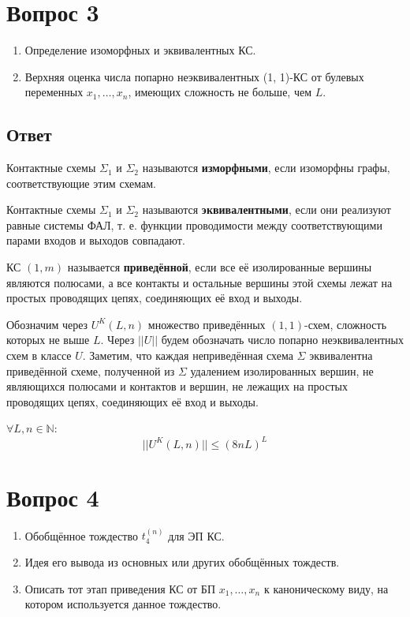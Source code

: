 \documentclass[11pt]{article}
\def\zall{\setcounter{Def}{0}\setcounter{lem}{0}\setcounter{cnsqnc}{0}\setcounter{th}{0}\setcounter{Cmt}{0}\setcounter{equation}{0}\setcounter{stnmt}{0}}
\newcounter{Def}\setcounter{Def}{0}
\def\df{\par\smallskip\refstepcounter{Def}\textbf{\arabic{Def}}}
\newtheorem*{Def}{Определение \df}
\newcounter{lem}\setcounter{lem}{0}
\def\lm{\par\smallskip\refstepcounter{lem}\textbf{\arabic{lem}}}
\newtheorem*{Lemma}{Лемма \lm}
\newcounter{th}\setcounter{th}{0}
\newcounter{cnsqnc}\setcounter{cnsqnc}{0}
\newcounter{Cmt}\setcounter{Cmt}{0}
\newcounter{stnmt}\setcounter{stnmt}{0}
\begin{document}
\section{Вопрос 3}
\label{sec:org0a22519}
\zall
\begin{enumerate}
\item Определение изоморфных и эквивалентных КС.
\item Верхняя оценка числа попарно неэквивалентных (1, 1)-КС от булевых переменных \(x_1, \ldots, x_n\), имеющих сложность не больше, чем \(L\).
\end{enumerate}
\subsection{Ответ}
\label{sec:org7de6af1}
   \begin{Def}
Контактные схемы $\Sigma_1$ и $\Sigma_2$ называются \textbf{изморфными}, если изоморфны 
графы, соответствующие этим схемам.
   \end{Def}
\begin{Def}
Контактные схемы $\Sigma_1$ и $\Sigma_2$ называются \textbf{эквивалентными}, если они реализуют равные системы ФАЛ, т. е. функции проводимости между соответствующими парами входов и выходов совпадают.
\end{Def}
\begin{Def}
КС $(1, m)$ называется \textbf{приведённой}, если все её изолированные вершины являются полюсами, а все контакты и остальные вершины этой схемы лежат на простых проводящих цепях, соединяющих её вход и выходы.
\end{Def}
Обозначим через $U^K(L, n)$ множество приведённых $(1, 1)$-схем, сложность которых не выше $L$. Через $||U||$ будем обозначать число попарно неэквивалентных схем в классе $U$. Заметим, что каждая неприведённая схема $\Sigma$ эквивалентна приведённой схеме, полученной из $\Sigma$ удалением изолированных вершин, не являющихся полюсами и контактов и вершин, не лежащих на простых проводящих цепях, соединяющих её вход и выходы.
\begin{Lemma}
$\forall L, n \in \mathbb{N}$:
\begin{equation*}
||U^K(L, n)|| \leq (8nL)^L
\end{equation*}
\end{Lemma}
\pagebreak
\section{Вопрос 4}
\label{sec:org6d1fa0a}
\zall
\begin{enumerate}
\item Обобщённое тождество \(t_4^{(n)}\) для ЭП КС.
\item Идея его вывода из основных или других обобщённых тождеств.
\item Описать тот этап приведения КС от БП \(x_1, \ldots, x_n\) к каноническому виду, на котором используется данное тождество.
\end{enumerate}
\end{document}
